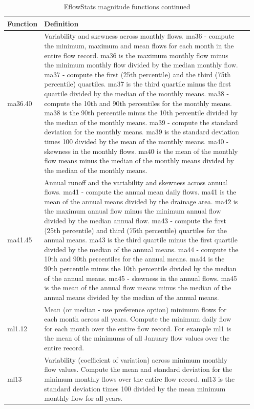 \documentclass[a4paper,11pt]{article}\usepackage[]{graphicx}\usepackage[]{color}
\begin{document}
\begin{table}[ht]
  \centering
  \begin{threeparttable}[b]
  \caption{EflowStats magnitude functions continued}
  \label{tab:mag2Stats}
  \begin{tabularx}{\textwidth}{lXl}
  \hline
\textbf{Function} & \textbf{Definition} \\ 
  \hline
  ma36.40 & Variability and skewness across monthly flows. ma36 - compute the minimum, maximum and mean flows for each month in the entire flow record. ma36 is the maximum monthly flow minus the minimum monthly flow divided by the median monthly flow. ma37 - compute the first (25th percentile) and the third (75th percentile) quartiles. ma37 is the third quartile minus the first quartile divided by the median of the monthly means. ma38 - compute the 10th and 90th percentiles for the monthly means. ma38 is the 90th percentile minus the 10th percentile divided by the median of the monthly means. ma39 - compute the standard deviation for the monthly means. ma39 is the standard deviation times 100 divided by the mean of the monthly means. ma40 - skewness in the monthly flows. ma40 is the mean of the monthly flow means minus the median of the monthly means divided by the median of the monthly means. \\
  ma41.45 & Annual runoff and the variability and skewness across annual flows. ma41 - compute the annual mean daily flows. ma41 is the mean of the annual means divided by the drainage area. ma42 is the maximum annual flow minus the minimum annual flow divided by the median annual flow. ma43 - compute the first (25th percentile) and third (75th percentile) quartiles for the annual means. ma43 is the third quartile minus the first quartile divided by the median of the annual means. ma44 - compute the 10th and 90th percentiles for the annual means. ma44 is the 90th percentile minus the 10th percentile divided by the median of the annual means. ma45 - skewness in the annual flows. ma45 is the mean of the annual flow means minus the median of the annual means divided by the median of the annual means. \\
  ml1.12 & Mean (or median - use preference option) minimum flows for each month across all years. Compute the minimum daily flow for each month over the entire flow record. For example ml1 is the mean of the minimums of all January flow values over the entire record. \\
  ml13 & Variability (coefficient of variation) across minimum monthly flow values. Compute the mean and standard deviation for the minimum monthly flows over the entire flow record. ml13 is the standard deviation times 100 divided by the mean minimum monthly flow for all years. \\

\end{tabularx}
\end{threeparttable}
\end{table}
\end{document}
